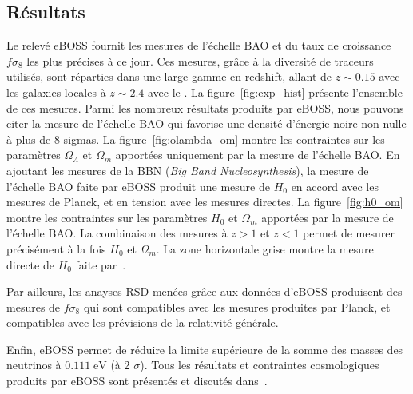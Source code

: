 \subsection{Résultats}
Le relevé eBOSS fournit les mesures de l'échelle BAO et du taux de croissance $f \sigma_8$ les plus précises à ce jour. Ces mesures, grâce à la diversité de traceurs utilisés, sont réparties dans une large gamme en redshift, allant de $z \sim 0.15$ avec les galaxies locales à $z \sim 2.4$ avec le \lya{}.
La figure~\ref{fig:exp_hist} présente l'ensemble de ces mesures.
Parmi les nombreux résultats produits par eBOSS, nous pouvons citer la mesure de l'échelle BAO qui favorise une densité d'énergie noire non nulle à plus de 8 sigmas. %
La figure~\ref{fig:olambda_om} montre les contraintes sur les paramètres $\Omega_{\Lambda}$ et $\Omega_{m}$ apportées uniquement par la mesure de l'échelle BAO.
En ajoutant les mesures de la BBN (\emph{Big Band Nucleosynthesis}), la mesure de l'échelle BAO faite par eBOSS produit une mesure de $H_0$ en accord avec les mesures de Planck, et en tension avec les mesures directes.
La figure~\ref{fig:h0_om} montre les contraintes sur les paramètres $H_0$ et $\Omega_{m}$ apportées par la mesure de l'échelle BAO. La combinaison des mesures à $z > 1$ et $z < 1$ permet de mesurer précisément à la fois $H_0$ et $\Omega_{m}$. La zone horizontale grise montre la mesure directe de $H_0$ faite par~\textcite{Riess2019}.

Par ailleurs, les anayses RSD menées grâce aux données d'eBOSS produisent des mesures de $f\sigma_8$ qui sont compatibles avec les mesures produites par Planck, et compatibles avec les prévisions de la relativité générale.

Enfin, eBOSS permet de réduire la limite supérieure de la somme des masses des neutrinos à $\num{0.111}\; \mathrm{eV}$ (à 2 $\sigma$).
Tous les résultats et contraintes cosmologiques produits par eBOSS sont présentés et discutés dans~\textcite{Collaboration2020}.


